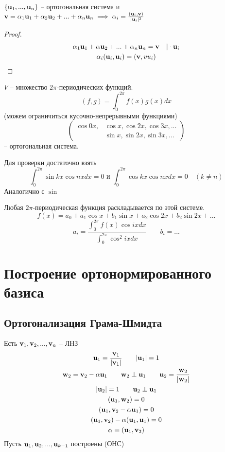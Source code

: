\documentclass[main]{subfiles}
\begin{document}
\begin{assertion}
    $\{\mathbf{u}_1, ..., \mathbf{u}_n\}$ -- ортогональная система и
    $\mathbf{v} = \alpha_1 \mathbf{u}_1 + \alpha_2 \mathbf{u}_2 + ... + \alpha_n \mathbf{u}_n
        \implies \alpha_i = \frac{(\mathbf{u}_i, \mathbf{v})}{|\mathbf{u}_i|^2}$
\end{assertion}
\begin{proof}
    \begin{gather*}
        \alpha_1 \mathbf{u}_1 + \alpha \mathbf{u}_2 + ... + \alpha_n \mathbf{u}_n = \mathbf{v} \quad |\cdot \mathbf{u}_i\\
        \alpha_i(\mathbf{u}_i, \mathbf{u}_i) = (\mathbf{v}, vu_i)
    \end{gather*}
\end{proof}
\begin{example}
    $V$ -- множество $2\pi$-периодических функций.
    \[(f,g) = \int_0^{2\pi} f(x)g(x)dx\]
    (можем ограничиться кусочно-непрерывными функциями)
    \[\left(
        \begin{aligned}
                \cos0x, & \cos x, \cos 2x, \cos 3x, ... \\
                        & \sin x, \sin 2x, \sin 3x, ...
            \end{aligned}
        \right)\]
    -- ортогональная система.

    Для проверки достаточно взять
    \[\int_0^{2\pi} \sin kx \cos nx dx = 0 \text{ и }
        \int_0^{2\pi} \cos kx \cos nx dx =0 \quad (k\neq n)\]
    Аналогично с $\sin$

    Любая $2\pi$-периодическая функция раскладывается по этой системе.
    \[f(x) = a_0 + a_1 \cos x + b_1 \sin x + a_2 \cos 2x + b_2 \sin 2x + ...\]
    \[a_i = \frac{\int_0^{2\pi} f(x) \cos ix dx}{\int_0^{2\pi} \cos^2 ix dx} \qquad b_i=...\]
\end{example}


\section{Построение ортонормированного базиса}
\subsection{Ортогонализация Грама-Шмидта}
Есть $\mathbf{v}_1, \mathbf{v}_2, ..., \mathbf{v}_n$ -- ЛНЗ
\begin{gather*}
    \mathbf{u}_1 = \frac{\mathbf{v}_1}{|\mathbf{v}_1|} \qquad |\mathbf{u}_1| = 1\\
    \mathbf{w}_2 = \mathbf{v}_2 - \alpha \mathbf{u}_1 \qquad \mathbf{w}_2 \perp \mathbf{u}_1 \qquad \mathbf{u}_2 = \frac{\mathbf{w}_2}{|\mathbf{w}_2|}\\
    |\mathbf{u}_2|=1 \qquad \mathbf{u}_2 \perp \mathbf{u}_1\\
    (\mathbf{u}_1, \mathbf{w}_2) = 0\\
    (\mathbf{u}_1, \mathbf{v}_2 - \alpha \mathbf{u}_ 1) = 0\\
    (\mathbf{u}_1, \mathbf{v}_2) - \alpha (\mathbf{u}_1, \mathbf{u}_1)=0\\
    \alpha = (\mathbf{u}_1, \mathbf{v}_2)
\end{gather*}
Пусть $\mathbf{u}_1, \mathbf{u}_2, ..., \mathbf{u}_{k-1}$ построены (ОНС)
\end{document}
